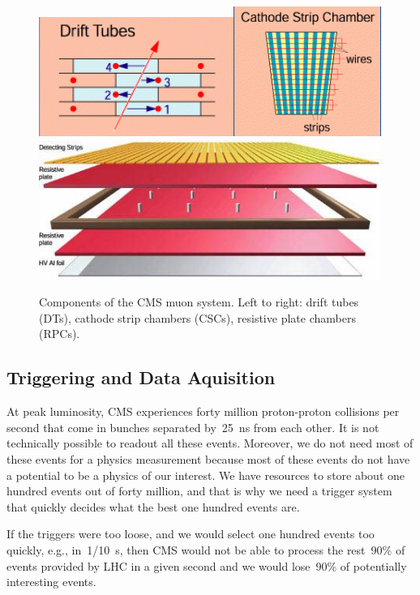 \begin{figure}[htb]
  \begin{center}
    \includegraphics[height=2.5 cm]{../figs/Exp/muonSystem_driftTubes.png}\quad\includegraphics[height=2.5 cm]{../figs/Exp/muonSystem_CSC.png}\quad\includegraphics[height=2.5 cm]{../figs/Exp/muonSystem_RPC.png}
    \caption{Components of the CMS muon system. Left to right: drift tubes (DTs), cathode strip chambers (CSCs), resistive plate chambers (RPCs).}
    \label{fig:muonSystem}
  \end{center}
\end{figure}


\subsection{Triggering and Data Aquisition}

At peak luminosity, CMS experiences forty million proton-proton collisions per second that come in bunches separated by~25~ns from each other. It is not technically possible to readout all these events. Moreover, we do not need most of these events for a physics measurement because most of these events do not have a potential to be a physics of our interest. We have resources to store about one hundred events out of forty million, and that is why we need a trigger system that quickly decides what the best one hundred events are.


If the triggers were too loose, and we would select one hundred events too quickly, e.g., in~1/10~s, then CMS would not be able to process the rest~90\% of events provided by LHC in a given second and we would lose~90\% of potentially interesting events.

